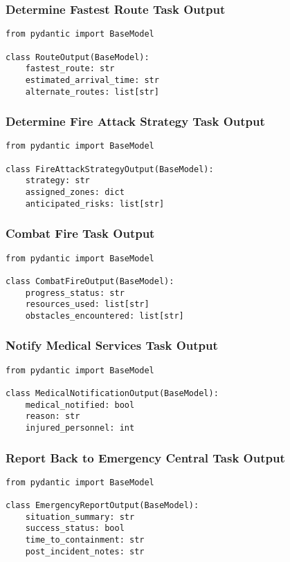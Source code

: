 \subsubsection{Determine Fastest Route Task Output}
\begin{lstlisting}[caption={Pydantic model for Determine Fastest Route Task Output}]
from pydantic import BaseModel

class RouteOutput(BaseModel):
    fastest_route: str
    estimated_arrival_time: str
    alternate_routes: list[str]
\end{lstlisting}

\subsubsection{Determine Fire Attack Strategy Task Output}
\begin{lstlisting}[caption={Pydantic model for Determine Fire Attack Strategy Task Output}]
from pydantic import BaseModel

class FireAttackStrategyOutput(BaseModel):
    strategy: str
    assigned_zones: dict
    anticipated_risks: list[str]
\end{lstlisting}

\subsubsection{Combat Fire Task Output}
\begin{lstlisting}[caption={Pydantic model for Combat Fire Task Output}]
from pydantic import BaseModel

class CombatFireOutput(BaseModel):
    progress_status: str
    resources_used: list[str]
    obstacles_encountered: list[str]
\end{lstlisting}

\subsubsection{Notify Medical Services Task Output}
\begin{lstlisting}[caption={Pydantic model for Notify Medical Services Task Output}]
from pydantic import BaseModel

class MedicalNotificationOutput(BaseModel):
    medical_notified: bool
    reason: str
    injured_personnel: int
\end{lstlisting}

\subsubsection{Report Back to Emergency Central Task Output}
\begin{lstlisting}[caption={Pydantic model for Report Back to Emergency Central Task Output}]
from pydantic import BaseModel

class EmergencyReportOutput(BaseModel):
    situation_summary: str
    success_status: bool
    time_to_containment: str
    post_incident_notes: str
\end{lstlisting}

